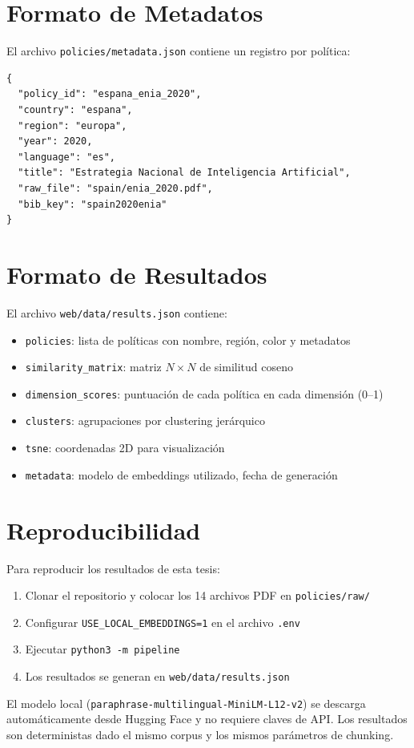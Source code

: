 \section{Formato de Metadatos}

El archivo \texttt{policies/metadata.json} contiene un registro por política:

\begin{verbatim}
{
  "policy_id": "espana_enia_2020",
  "country": "espana",
  "region": "europa",
  "year": 2020,
  "language": "es",
  "title": "Estrategia Nacional de Inteligencia Artificial",
  "raw_file": "spain/enia_2020.pdf",
  "bib_key": "spain2020enia"
}
\end{verbatim}

\section{Formato de Resultados}

El archivo \texttt{web/data/results.json} contiene:

\begin{itemize}
\item \texttt{policies}: lista de políticas con nombre, región, color y metadatos
\item \texttt{similarity\_matrix}: matriz $N \times N$ de similitud coseno
\item \texttt{dimension\_scores}: puntuación de cada política en cada dimensión (0--1)
\item \texttt{clusters}: agrupaciones por clustering jerárquico
\item \texttt{tsne}: coordenadas 2D para visualización
\item \texttt{metadata}: modelo de embeddings utilizado, fecha de generación
\end{itemize}

\section{Reproducibilidad}

Para reproducir los resultados de esta tesis:
\begin{enumerate}
\item Clonar el repositorio y colocar los 14 archivos PDF en \texttt{policies/raw/}
\item Configurar \texttt{USE\_LOCAL\_EMBEDDINGS=1} en el archivo \texttt{.env}
\item Ejecutar \texttt{python3 -m pipeline}
\item Los resultados se generan en \texttt{web/data/results.json}
\end{enumerate}

El modelo local (\texttt{paraphrase-multilingual-MiniLM-L12-v2}) se descarga automáticamente desde Hugging Face y no requiere claves de API. Los resultados son deterministas dado el mismo corpus y los mismos parámetros de chunking.
